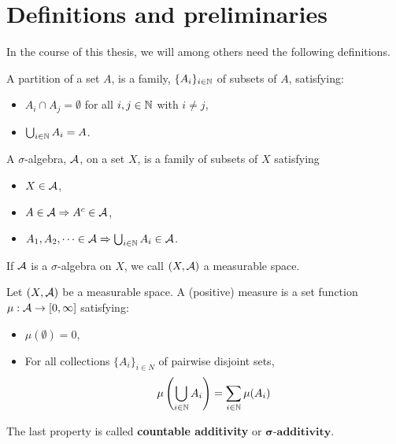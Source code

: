 \documentclass[../../main.tex]{subfiles}
\begin{document}
\section{Definitions and preliminaries}

In the course of this thesis, we will among others need the following definitions.


\begin{definition}
A partition of a set $A$, is a family, $\{A_{i}\}_{i\in \mathbb{N}}$ of subsets of $A$, satisfying:
\begin{itemize}
\item $A_{i} \cap A_{j} = \emptyset$ for all $i, j\in \mathbb{N}$ with $i \neq j$,
\item $\bigcup_{i\in \mathbb{N}} A_{i}=A$.
\end{itemize}
\end{definition}


\begin{definition}
A $\sigma$-algebra, $\mathcal{A}$, on a set $X$, is a family of subsets of $X$ satisfying
\begin{itemize}
\item $X\in \mathcal{A}$,
\item $A \in \mathcal{A} \Rightarrow A^{c}\in \mathcal{A}$,
\item $A_{1}, A_{2}, \dots \in \mathcal{A} \Rightarrow \bigcup_{i\in \mathbb{N}} A_{i} \in \mathcal{A}$.
\end{itemize}
\end{definition}

If $\mathcal{A}$ is a $\sigma$-algebra on $X$, we call $(X, \mathcal{A})$ a measurable space.

\begin{definition}
Let $(X,\mathcal{A})$ be a measurable space. A (positive) measure is a set function $\mu:\mathcal{A} \to [0,\infty]$ satisfying:
\begin{itemize}
\item $\mu(\emptyset) = 0$,
\item For all collections $\{A_{i}\}_{i\in N}$ of pairwise disjoint sets,
\begin{align*}
	\mu\left(\bigcup_{i\in \mathbb{N}} A_{i}\right) = \sum_{i\in \mathbb{N}} \mu(A_{i})
\end{align*}
\end{itemize}
The last property is called \textbf{countable additivity} or $\textbf{$\mathbf{\sigma}$-additivity}$.
\end{definition}
\end{document}
